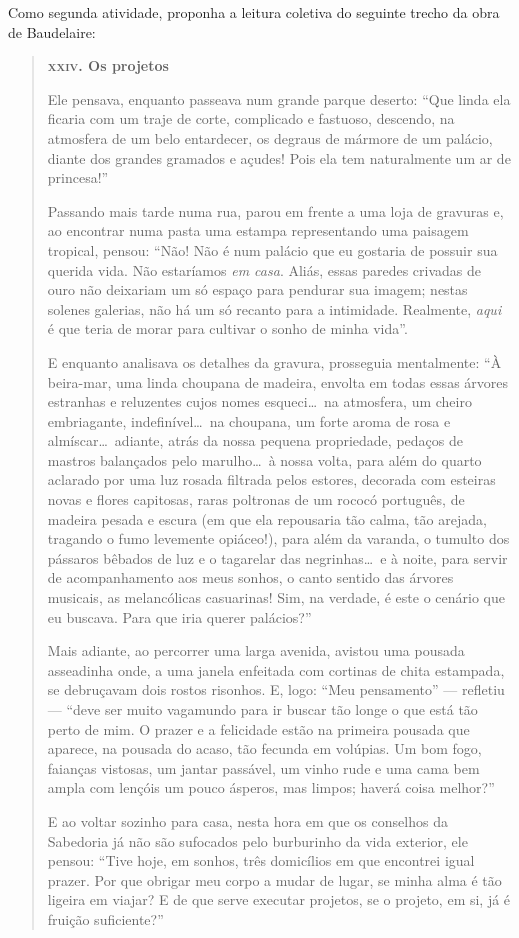 \documentclass[12pt]{extarticle}
\begin{document}
Como segunda atividade, proponha a leitura coletiva do seguinte trecho da obra de Baudelaire:

\begin{quote}
\dotfill

\textbf{\textsc{xxiv.} Os projetos}\medskip

Ele pensava, enquanto passeava num grande parque deserto:
``Que linda ela ficaria com um traje de corte, complicado
e fastuoso, descendo, na atmosfera de um belo entardecer, os
degraus de mármore de um palácio, diante dos grandes gramados e açudes!
Pois ela tem naturalmente um ar de princesa!''

Passando mais tarde numa rua, parou em frente a uma loja de gravuras
e, ao encontrar numa pasta uma estampa representando uma paisagem
tropical, pensou: ``Não! Não é num palácio que eu gostaria
de possuir sua querida vida. Não estaríamos \textit{em casa}. Aliás, essas
paredes crivadas de ouro não deixariam um só espaço para pendurar sua
imagem; nestas solenes galerias, não há um só recanto para a
intimidade. Realmente, \textit{aqui} é que teria de morar para cultivar
o sonho de minha vida''.

E enquanto analisava os detalhes da gravura, prosseguia mentalmente:
``À beira-mar, uma linda choupana de madeira, envolta
em todas essas árvores estranhas e reluzentes cujos nomes esqueci\ldots\ 
na atmosfera, um cheiro embriagante, indefinível\ldots\  na choupana, um
forte aroma de rosa e almíscar\ldots\  adiante, atrás da nossa
pequena propriedade, pedaços de mastros balançados pelo marulho\ldots\  à nossa volta, para além do quarto aclarado por uma luz rosada filtrada
pelos estores, decorada com esteiras novas e flores capitosas, raras poltronas de um rococó português, de madeira pesada e escura (em
que ela repousaria tão calma, tão arejada, tragando o fumo
levemente opiáceo!), para além da varanda, o tumulto dos pássaros bêbados de
luz e o tagarelar das negrinhas\ldots\  e à noite, para servir de
acompanhamento aos meus sonhos, o canto sentido das árvores musicais,
as melancólicas casuarinas! Sim, na verdade, é este o cenário que eu
buscava. Para que iria querer palácios?''

Mais adiante, ao percorrer uma larga avenida, avistou uma pousada
asseadinha onde, a uma janela enfeitada com cortinas de chita
estampada, se debruçavam dois rostos risonhos. E, logo:
``Meu pensamento'' --- refletiu --- ``deve ser muito vagamundo
para ir buscar tão longe o que está tão perto de mim. O prazer e a
felicidade estão na primeira pousada que aparece, na pousada do
acaso, tão fecunda em volúpias. Um bom fogo, faianças vistosas, um
jantar passável, um vinho rude e uma cama bem ampla com lençóis um
pouco ásperos, mas limpos; haverá coisa melhor?''

E ao voltar sozinho para casa, nesta hora em que os conselhos da
Sabedoria já não são sufocados pelo burburinho da vida exterior,
ele pensou: ``Tive hoje, em sonhos, três domicílios em que
encontrei igual prazer. Por que obrigar meu corpo a mudar de lugar, 
se minha alma é tão ligeira em viajar? E de que serve executar projetos,
se o projeto, em si, já é fruição suficiente?''

\dotfill
\end{quote}
\end{document}
